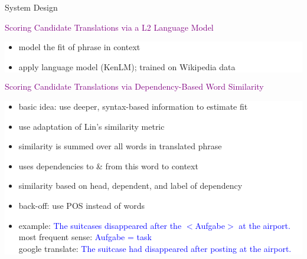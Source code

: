 \documentclass[final,t]{beamer}
\begin{document}
\begin{frame}{}
\begin{columns}[t]
\begin{column}{.55\linewidth}
\begin{block}{System Design}
\begin{center}
  \textcolor{purple}{Scoring Candidate Translations via a L2 Language Model}
\end{center}
 
  \colorbox{white}{
\begin{minipage}{.90\linewidth}
 \begin{itemize}
  \item model the fit of phrase in context
  \item apply language model (KenLM); trained on Wikipedia data
  \end{itemize}
\end{minipage}
}
\vspace{1cm}






\begin{center}
  \textcolor{purple}{Scoring Candidate Translations via Dependency-Based Word Similarity}
\end{center}

  \colorbox{white}{
\begin{minipage}{.90\linewidth}
  \begin{itemize}
  \item basic idea: use deeper, syntax-based information to estimate fit
  \item use adaptation of Lin's similarity metric
  \item similarity is summed over all words in translated phrase
  \item uses dependencies to \& from this word to context
  \item similarity based on head, dependent, and label of dependency 
  \item back-off: use POS instead of words
  \item example: \textcolor{blue}{The suitcases disappeared after the $<$Aufgabe$>$ at the airport.}\\
  	most frequent sense: \textcolor{blue}{Aufgabe = task}\\
	google translate: \textcolor{blue}{The suitcase had disappeared after posting at the airport.}
  \end{itemize}
\end{minipage}
}
\vspace{1cm}


\end{block}
\end{column}
\end{columns}
\end{frame}
\end{document}
